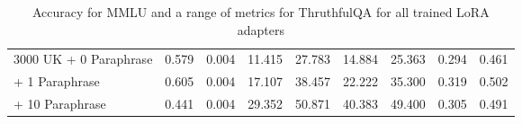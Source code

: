 \begin{table*}[!ht]
\begin{tabular}{l|cc|cccccc}
3000 UK \hspace{0.5ex} + \hspace{1.5ex} 0 Paraphrase  & 0.579                                 & 0.004                                & 11.415                            & 27.783                               & 14.884                               & 25.363                               & 0.294                                & 0.461                                \\
\hspace{9.3ex} + \hspace{1.5ex} 1 Paraphrase  & 0.605                                 & 0.004                                & 17.107                            & 38.457                               & 22.222                               & 35.300                               & 0.319                                & 0.502                                \\
 \hspace{9.3ex} + \hspace{0.5ex} 10 Paraphrase & 0.441                                 & 0.004                                & 29.352                            & 50.871                               & 40.383                               & 49.400                               & 0.305                                & 0.491                                \\ \bottomrule
\end{tabular}                   
\caption{Accuracy for MMLU and a range of metrics  for ThruthfulQA for all trained LoRA adapters}
\label{table:benchmarks}
\end{table*}